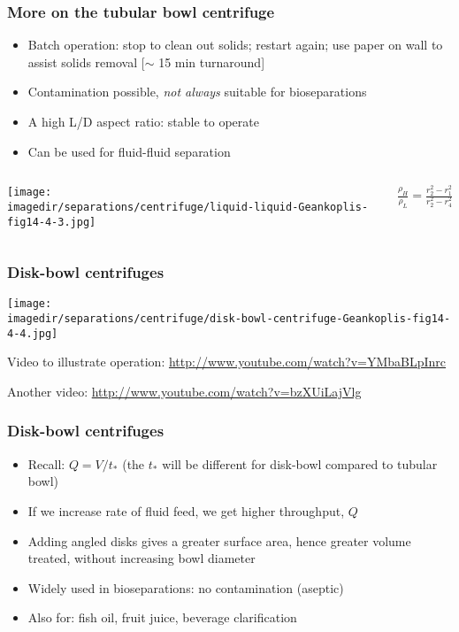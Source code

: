 \begin{frame}\frametitle{More on the tubular bowl centrifuge}
	\begin{itemize}
		\item	Batch operation: stop to clean out solids; restart again; use paper on wall to assist solids removal [$\sim$ 15 min turnaround]
		\item	Contamination possible, \emph{not always} suitable for bioseparations
		\item	A high L/D aspect ratio: stable to operate
		\item	Can be used for fluid-fluid separation
	\end{itemize}
	\begin{columns}[c]
			\begin{center}
				\texttt{[image: \\imagedir/separations/centrifuge/liquid-liquid-Geankoplis-fig14-4-3.jpg]}
			\end{center}
				$\displaystyle \frac{\rho_H}{\rho_L} = \displaystyle \frac{r_2^2 - r_1^2}{r_2^2 - r_4^2}$
	\end{columns}
\end{frame}

\begin{frame}\frametitle{Disk-bowl centrifuges}
	\begin{center}
		\texttt{[image: \\imagedir/separations/centrifuge/disk-bowl-centrifuge-Geankoplis-fig14-4-4.jpg]}
	\end{center}

	\vspace{12pt}
	Video to illustrate operation: \href{http://www.youtube.com/watch?v=YMbaBLpInrc}{http://www.youtube.com/watch?v=YMbaBLpInrc}

	\vspace{2pt}
	{\tiny Another video: \href{http://www.youtube.com/watch?v=bzXUiLajVlg}{http://www.youtube.com/watch?v=bzXUiLajVlg}}

\end{frame}

\begin{frame}\frametitle{Disk-bowl centrifuges}
	\begin{itemize}
		\item	Recall: $Q = V / t_*$ (the $t_*$ will be different for disk-bowl compared to tubular bowl)
		\item	If we increase rate of fluid feed, we get higher throughput, $Q$
		\item	Adding angled disks gives a greater surface area, hence greater volume treated, without increasing bowl diameter
		\item	Widely used in bioseparations: no contamination (aseptic)
		\item	Also for: fish oil, fruit juice, beverage clarification
	\end{itemize}
\end{frame}

